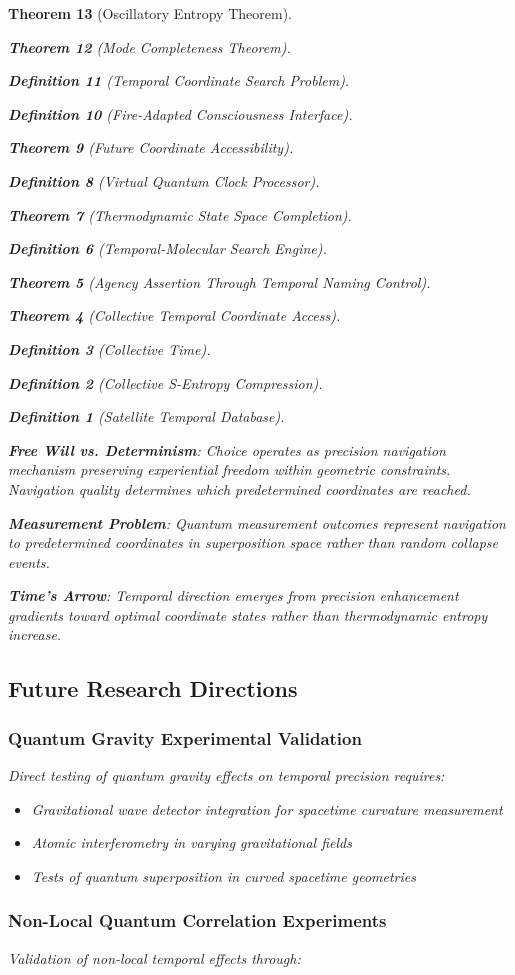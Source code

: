 \documentclass[12pt,a4paper]{article}
\newtheorem{theorem}{Theorem}[section]
\newtheorem{definition}[theorem]{Definition}
\begin{document}
\begin{theorem}[Oscillatory Entropy Theorem]
\begin{theorem}[Mode Completeness Theorem]
\begin{enumerate}
\begin{definition}[Temporal Coordinate Search Problem]
\begin{algorithm}
\begin{definition}[Fire-Adapted Consciousness Interface]
\begin{theorem}[Future Coordinate Accessibility]
\begin{definition}[Virtual Quantum Clock Processor]
\begin{itemize}
\begin{itemize}
\begin{theorem}[Thermodynamic State Space Completion]
\begin{definition}[Temporal-Molecular Search Engine]
\begin{theorem}[Agency Assertion Through Temporal Naming Control]
\begin{remark}
\begin{theorem}[Collective Temporal Coordinate Access]
\begin{definition}[Collective Time]
\begin{definition}[Collective S-Entropy Compression]
\begin{definition}[Satellite Temporal Database]
\begin{algorithm}
\begin{table}[h]
{{\textbf{Free Will vs. Determinism}: Choice operates as precision navigation mechanism preserving experiential freedom within geometric constraints. Navigation quality determines which predetermined coordinates are reached.

\textbf{Measurement Problem}: Quantum measurement outcomes represent navigation to predetermined coordinates in superposition space rather than random collapse events.

\textbf{Time's Arrow}: Temporal direction emerges from precision enhancement gradients toward optimal coordinate states rather than thermodynamic entropy increase.

\subsection{Future Research Directions}

\subsubsection{Quantum Gravity Experimental Validation}

Direct testing of quantum gravity effects on temporal precision requires:

\begin{itemize}
\item Gravitational wave detector integration for spacetime curvature measurement
\item Atomic interferometry in varying gravitational fields
\item Tests of quantum superposition in curved spacetime geometries
\end{itemize}

\subsubsection{Non-Local Quantum Correlation Experiments}

Validation of non-local temporal effects through:

}}
\end{table}
\end{algorithm}
\end{definition}
\end{definition}
\end{definition}
\end{theorem}
\end{remark}
\end{theorem}
\end{definition}
\end{theorem}
\end{itemize}
\end{itemize}
\end{definition}
\end{theorem}
\end{definition}
\end{algorithm}
\end{definition}
\end{enumerate}
\end{theorem}
\end{theorem}
\end{document}
